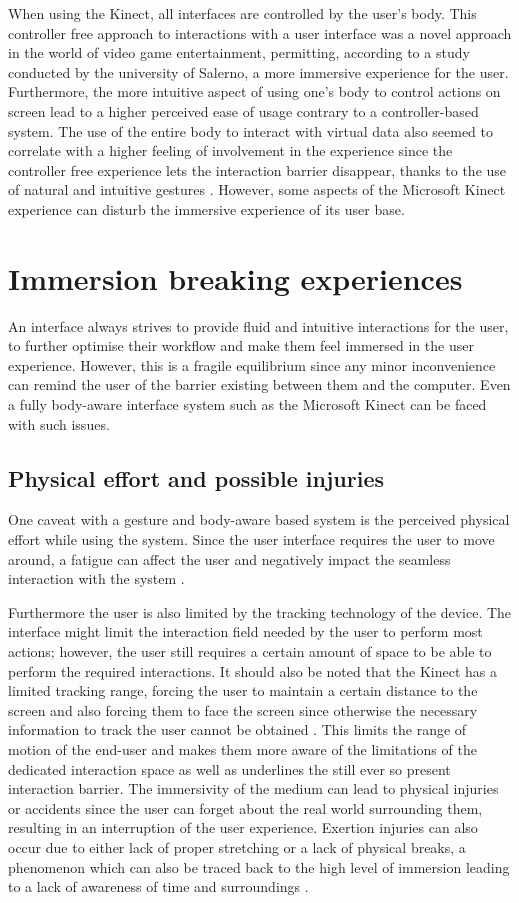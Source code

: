 \documentclass{sigchi}
\begin{document}
When using the Kinect, all interfaces are controlled by the user’s body. This controller free approach to interactions with a user interface was a novel approach in the world of video game entertainment, permitting, according to a study conducted by the university of Salerno, a more immersive experience for the user. Furthermore, the more intuitive aspect of using one’s body to control actions on screen lead to a higher perceived ease of usage contrary to a controller-based system. The use of the entire body to interact with virtual data also seemed to correlate with a higher feeling of involvement in the experience since the controller free experience lets the interaction barrier disappear, thanks to the use of natural and intuitive gestures \cite{Francese2012}. However, some aspects of the Microsoft Kinect experience can disturb the immersive experience of its user base.


\section{Immersion breaking experiences}
An interface always strives to provide fluid and intuitive interactions for the user, to further optimise their workflow and make them feel immersed in the user experience. However, this is a fragile equilibrium since any minor inconvenience can remind the user of the barrier existing between them and the computer. Even a fully body-aware interface system such as the Microsoft Kinect can be faced with such issues.

\subsection{Physical effort and possible injuries}
One caveat with a gesture and body-aware based system is the perceived physical effort while using the system. Since the user interface requires the user to move around, a fatigue can affect the user and negatively impact the seamless interaction with the system \cite{Francese2012}.

Furthermore the user is also limited by the tracking technology of the device. The interface might limit the interaction field needed by the user to perform most actions; however, the user still requires a certain amount of space to be able to perform the required interactions. It should also be noted that the Kinect has a limited tracking range, forcing the user to maintain a certain distance to the screen and also forcing them to face the screen since otherwise the necessary information to track the user cannot be obtained \cite{Andersen2012}. This limits the range of motion of the end-user and makes them more aware of the limitations of the dedicated interaction space as well as underlines the still ever so present interaction barrier.
The immersivity of the medium can lead to physical injuries or accidents since the user can forget about the real world surrounding them, resulting in an interruption of the user experience. Exertion injuries can also occur due to either lack of proper stretching or a lack of physical breaks, a phenomenon which can also be traced back to the high level of immersion leading to a lack of awareness of time and surroundings \cite{Pasch2009}.
\end{document}
